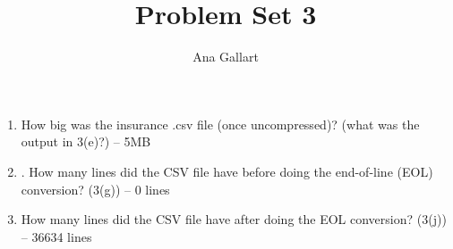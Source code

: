 \documentclass{article}
\title{Problem Set 3}
\author{Ana Gallart}
\begin{document}
\maketitle

\begin{enumerate}
  \item How big was the insurance .csv file (once uncompressed)? (what was the
output in 3(e)?) -- 5MB 
  \item . How many lines did the CSV file have before doing the end-of-line (EOL) conversion? (3(g)) -- 0 lines
  \item How many lines did the CSV file have after doing the EOL conversion? (3(j)) -- 36634 lines
\end{enumerate} 
\end{document}
